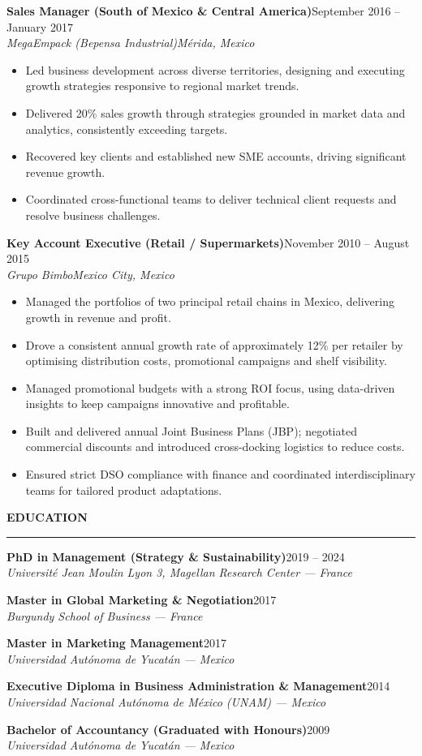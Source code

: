 \documentclass[10pt,a4paper]{article}
\newcommand{\cvsection}[1]{%
  \vspace{0.6em}%
  {\large\bfseries #1}\par
  \vspace{-0.45em}%
  \rule{\textwidth}{0.6pt}\par
  \vspace{0.25em}%
}
\newcommand{\job}[4]{%
  \vspace{0.3em}%
  \noindent\textbf{#1}\hfill #2\\[0.08em]
  \textit{#3}\hfill \textit{#4}\par
  \vspace{0.05em}%
}
\newcommand{\edu}[3]{%
  \noindent\textbf{#1}\hfill #3\\[0.1em]
  \textit{#2}\par
  \vspace{0.25em}%
}
\begin{document}
\job{Sales Manager (South of Mexico \& Central America)}{September 2016 -- January 2017}{MegaEmpack (Bepensa Industrial)}{M\'erida, Mexico}
\begin{itemize}
  \item Led business development across diverse territories, designing and executing growth strategies responsive to regional market trends.
  \item Delivered 20\% sales growth through strategies grounded in market data and analytics, consistently exceeding targets.
  \item Recovered key clients and established new SME accounts, driving significant revenue growth.
  \item Coordinated cross-functional teams to deliver technical client requests and resolve business challenges.
\end{itemize}

\job{Key Account Executive (Retail / Supermarkets)}{November 2010 -- August 2015}{Grupo Bimbo}{Mexico City, Mexico}
\begin{itemize}
  \item Managed the portfolios of two principal retail chains in Mexico, delivering growth in revenue and profit.
  \item Drove a consistent annual growth rate of approximately 12\% per retailer by optimising distribution costs, promotional campaigns and shelf visibility.
  \item Managed promotional budgets with a strong ROI focus, using data-driven insights to keep campaigns innovative and profitable.
  \item Built and delivered annual Joint Business Plans (JBP); negotiated commercial discounts and introduced cross-docking logistics to reduce costs.
  \item Ensured strict DSO compliance with finance and coordinated interdisciplinary teams for tailored product adaptations.
\end{itemize}

\cvsection{EDUCATION}

\edu{PhD in Management (Strategy \& Sustainability)}{Universit\'e Jean Moulin Lyon 3, Magellan Research Center --- France}{2019 -- 2024}
\edu{Master in Global Marketing \& Negotiation}{Burgundy School of Business --- France}{2017}
\edu{Master in Marketing Management}{Universidad Aut\'onoma de Yucat\'an --- Mexico}{2017}
\edu{Executive Diploma in Business Administration \& Management}{Universidad Nacional Aut\'onoma de M\'exico (UNAM) --- Mexico}{2014}
\edu{Bachelor of Accountancy (Graduated with Honours)}{Universidad Aut\'onoma de Yucat\'an --- Mexico}{2009}
\end{document}
